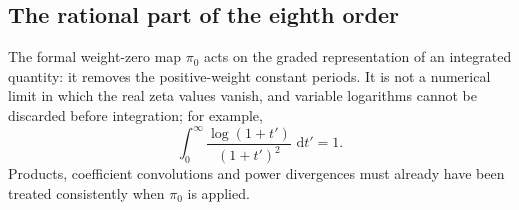 \documentclass[11pt,a4paper]{article}
\numberwithin{equation}{section}
\newcommand{\dd}{\,\mathrm d}
\begin{document}
\subsection{The rational part of the eighth order}\label{app:dualC:C8rational}
The formal weight-zero map $\pi_0$ acts on the graded representation of an integrated quantity: it removes the
positive-weight constant periods. It is not a numerical limit in which the real zeta values vanish, and variable
logarithms cannot be discarded before integration; for example,
\begin{equation}
 \int_0^\infty\frac{\log(1+t')}{(1+t')^2}\,\dd t'=1.
\end{equation}
Products, coefficient convolutions and power divergences must already have been treated consistently when $\pi_0$ is
applied.
\end{document}
